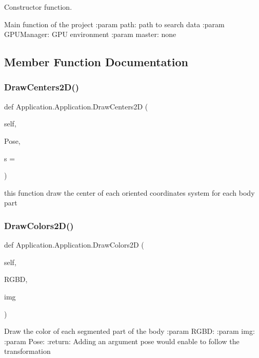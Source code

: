 Constructor function. 

\begin{DoxyVerb}Main function of the project
:param path: path to search data
:param GPUManager: GPU environment
:param master: none
\end{DoxyVerb}
 

\subsection{Member Function Documentation}
\mbox{\label{class_application_1_1_application_a3280e6b8e4616a56567d0daf7f60ff23}} 
\subsubsection{Draw\+Centers2\+D()}
{\footnotesize\ttfamily def Application.\+Application.\+Draw\+Centers2D (\begin{DoxyParamCaption}\item[{}]{self,  }\item[{}]{Pose,  }\item[{}]{s = {} }\end{DoxyParamCaption})}

\begin{DoxyVerb}this function draw the center of each oriented coordinates system for each body part\end{DoxyVerb}
 \mbox{\label{class_application_1_1_application_a935ca95709286fee970c85727bf5bab4}} 
\subsubsection{Draw\+Colors2\+D()}
{\footnotesize\ttfamily def Application.\+Application.\+Draw\+Colors2D (\begin{DoxyParamCaption}\item[{}]{self,  }\item[{}]{R\+G\+BD,  }\item[{}]{img }\end{DoxyParamCaption})}

\begin{DoxyVerb}Draw the color of each segmented part of the body
:param RGBD:
:param img:
:param Pose:
:return:
Adding an argument pose would enable to follow the transformation
\end{DoxyVerb}
 \mbox{\label{class_application_1_1_application_a766ac4121a3cd61ad34b957bced90427}} 
